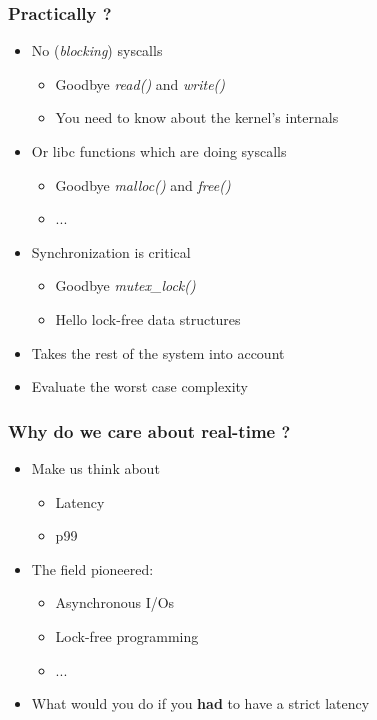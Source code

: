 \begin{frame}
  \frametitle{Practically ?}

  \begin{itemize}
  \item No (\emph{blocking}) syscalls
    \begin{itemize}
    \item Goodbye \emph{read()} and \emph{write()}
    \item You need to know about the kernel's internals
    \end{itemize}
  \item Or libc functions which are doing syscalls
    \begin{itemize}
    \item Goodbye \emph{malloc()} and \emph{free()}
    \item ...
    \end{itemize}
  \item Synchronization is critical
    \begin{itemize}
    \item Goodbye \emph{mutex\_lock()}
    \item Hello lock-free data structures
    \end{itemize}
  \item Takes the rest of the system into account
  \item Evaluate the worst case complexity
  \end{itemize}
\end{frame}


\begin{frame}
  \frametitle{Why do we care about real-time ?}

  \begin{itemize}
  \item Make us think about
    \begin{itemize}
    \item Latency
    \item p99
    \end{itemize}
  \item The field pioneered:
    \begin{itemize}
    \item Asynchronous I/Os
    \item Lock-free programming
    \item ...
    \end{itemize}
  \item What would you do if you \textbf{had} to have a strict latency
  \end{itemize}
\end{frame}



